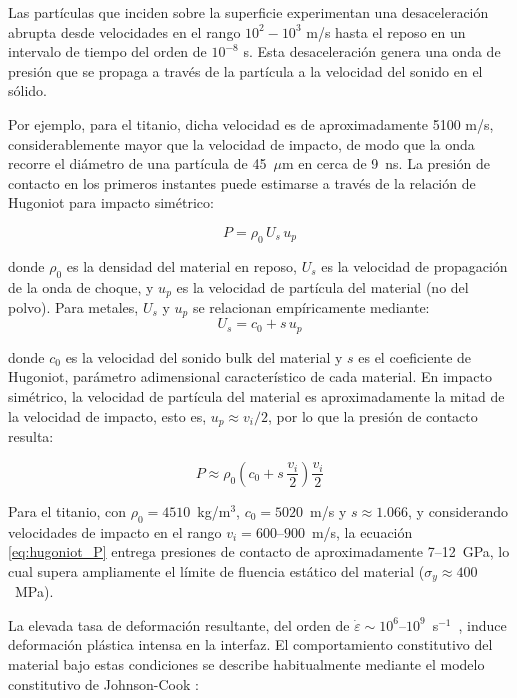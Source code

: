 Las partículas que inciden sobre la superficie experimentan una desaceleración 
abrupta desde velocidades en el rango \(10^2-10^3\) m/s hasta el reposo en un intervalo de tiempo del orden de \(10^{-8}\) s. Esta desaceleración genera una onda de presión que se propaga a través de la partícula a la velocidad del sonido en el sólido.

Por ejemplo, para el titanio, dicha velocidad es de aproximadamente 
5100 m/s, considerablemente mayor que la velocidad 
de impacto, de modo que la onda recorre el diámetro de una partícula 
de 45~\(\mu\)m en cerca de 9~ns. La presión de contacto en los 
primeros instantes puede estimarse a través de la relación de Hugoniot 
para impacto simétrico\cite{Marsh1980}:

\begin{equation}
	P = \rho_0 \, U_s \, u_p
	\label{eq:hugoniot_presion}
\end{equation}

donde $\rho_0$ es la densidad del material en reposo, $U_s$ es la 
velocidad de propagación de la onda de choque, y $u_p$ es la velocidad 
de partícula del material (no del polvo). Para metales, $U_s$ y $u_p$ 
se relacionan empíricamente mediante:
\begin{equation}
	U_s = c_0 + s \, u_p
	\label{eq:hugoniot_us}
\end{equation}

donde $c_0$ es la velocidad del sonido bulk del material y $s$ es el 
coeficiente de Hugoniot, parámetro adimensional característico de cada 
material. En impacto simétrico, la velocidad de partícula del material 
es aproximadamente la mitad de la velocidad de impacto, esto es, 
$u_p \approx v_i/2$, por lo que la presión de contacto resulta:

\begin{equation}
	P \approx \rho_0 \left(c_0 + s\,\frac{v_i}{2}\right)\frac{v_i}{2}
	\label{eq:hugoniot_P}
\end{equation}

Para el titanio, con $\rho_0 = 4510$~kg/m$^3$, $c_0 = 5020$~m/s y 
$s \approx 1.066$\cite{Marsh1980}, y considerando velocidades de 
impacto en el rango $v_i = 600$--$900$~m/s, la ecuación 
\ref{eq:hugoniot_P} entrega presiones de contacto de aproximadamente 
7--12~GPa, lo cual supera ampliamente el límite de fluencia estático 
del material ($\sigma_y \approx 400$~MPa).

La elevada tasa de deformación resultante, del orden de 
\(\dot{\varepsilon} \sim 10^6\)--\(10^9\)~s\(^{-1}\)~\cite{Assadi2003}, 
induce deformación plástica intensa en la interfaz. El comportamiento 
constitutivo del material bajo estas condiciones se describe habitualmente 
mediante el modelo constitutivo de Johnson-Cook \cite{Johnson1983}:

